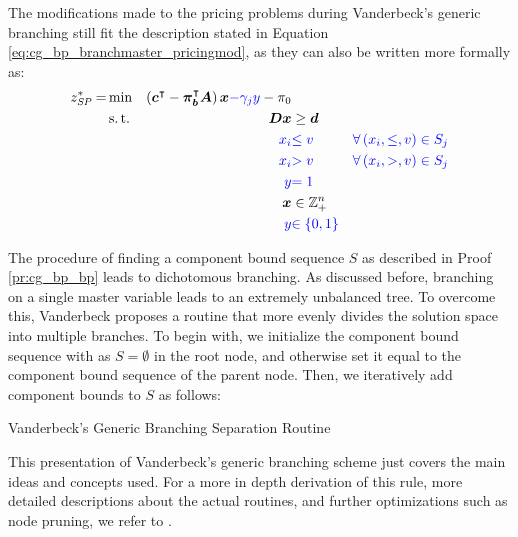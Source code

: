 \begin{note}
The modifications made to the pricing problems during Vanderbeck's generic branching still fit the description stated in Equation \eqref{eq:cg_bp_branchmaster_pricingmod}, as they can also be written more formally as:
\begin{equation}
\begin{aligned}
z^*_\SP{} = &\min & \left( \vec{c}\transpose - \vec{\pi}_\vec{b}\transpose \mat{A} \right) \vec{x} {\color{blue} - \gamma_j y} - \pi_0 & \\
&\st & \mat{D} \vec{x} & \geq \vec{d} \\
&& {\color{blue} x_i} & {\color{blue} \leq v} & {\color{blue} \forall \left( x_i, \leq, v \right) \in S_j} \\
&& {\color{blue} x_i} & {\color{blue} > v} & {\color{blue} \forall \left( x_i, >, v \right) \in S_j} \\
&& {\color{blue} y} & {\color{blue} = 1} \\
&& \vec{x} & \in \mathbb{Z}_+^n \\
&& {\color{blue} y} & {\color{blue} \in \{0, 1\}}
\end{aligned}
\end{equation}
\end{note}

The procedure of finding a component bound sequence $S$ as described in Proof \ref{pr:cg_bp_bp} leads to dichotomous branching. As discussed before, branching on a single master variable leads to an extremely unbalanced tree. To overcome this, Vanderbeck proposes a routine that more evenly divides the solution space into multiple branches. To begin with, we initialize the component bound sequence with as $S = \emptyset$ in the root node, and otherwise set it equal to the component bound sequence of the parent node. Then, we iteratively add component bounds to $S$ as follows:
\begin{algorithm}
\caption{Vanderbeck's Generic Branching Separation Routine}
\end{algorithm}

This presentation of Vanderbeck's generic branching scheme just covers the main ideas and concepts used. For a more in depth derivation of this rule, more detailed descriptions about the actual routines, and further optimizations such as node pruning, we refer to \cite{vanderbeck1996exact, vanderbeck2010reformulation, vanderbeck2011branching, schmickerath2012experiments}.
